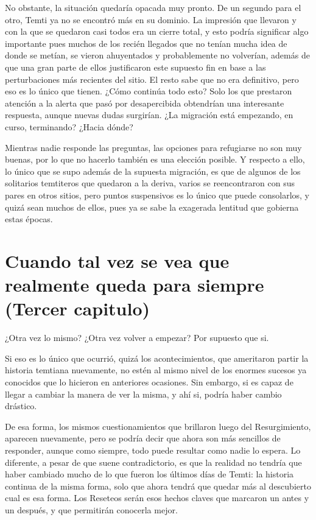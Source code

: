 \documentclass[
  spanish,
]{book}
\begin{document}
No obstante, la situación quedaría opacada muy pronto. De un segundo para el otro, Temti ya no se encontró más en su dominio. La impresión que llevaron y con la que se quedaron casi todos era un cierre total, y esto podría significar algo importante pues muchos de los recién llegados que no tenían mucha idea de donde se metían, se vieron ahuyentados y probablemente no volverían, además de que una gran parte de ellos justificaron este supuesto fin en base a las perturbaciones más recientes del sitio. El resto sabe que no era definitivo, pero eso es lo único que tienen. ¿Cómo continúa todo esto?
Solo los que prestaron atención a la alerta que pasó por desapercibida obtendrían una interesante respuesta, aunque nuevas dudas surgirían. ¿La migración está empezando, en curso, terminando? ¿Hacia dónde?

Mientras nadie responde las preguntas, las opciones para refugiarse no son muy buenas, por lo que no hacerlo también es una elección posible. Y respecto a ello, lo único que se supo además de la supuesta migración, es que de algunos de los solitarios temtiteros que quedaron a la deriva, varios se reencontraron con sus pares en otros sitios, pero puntos suspensivos es lo único que puede consolarlos, y quizá sean muchos de ellos, pues ya se sabe la exagerada lentitud que gobierna estas épocas.

\hypertarget{cuando-tal-vez-se-vea-que-realmente-queda-para-siempre-tercer-capitulo}{%
\chapter{Cuando tal vez se vea que realmente queda para siempre (Tercer capitulo)}\label{cuando-tal-vez-se-vea-que-realmente-queda-para-siempre-tercer-capitulo}}

¿Otra vez lo mismo? ¿Otra vez volver a empezar? Por supuesto que si.

Si eso es lo único que ocurrió, quizá los acontecimientos, que ameritaron partir la historia temtiana nuevamente, no estén al mismo nivel de los enormes sucesos ya conocidos que lo hicieron en anteriores ocasiones. Sin embargo, si es capaz de llegar a cambiar la manera de ver la misma, y ahí si, podría haber cambio drástico.

De esa forma, los mismos cuestionamientos que brillaron luego del Resurgimiento, aparecen nuevamente, pero se podría decir que ahora son más sencillos de responder, aunque como siempre, todo puede resultar como nadie lo espera. Lo diferente, a pesar de que suene contradictorio, es que la realidad no tendría que haber cambiado mucho de lo que fueron los últimos días de Temti: la historia continua de la misma forma, solo que ahora tendrá que quedar más al descubierto cual es esa forma. Los Reseteos serán esos hechos claves que marcaron un antes y un después, y que permitirán conocerla mejor.
\end{document}
